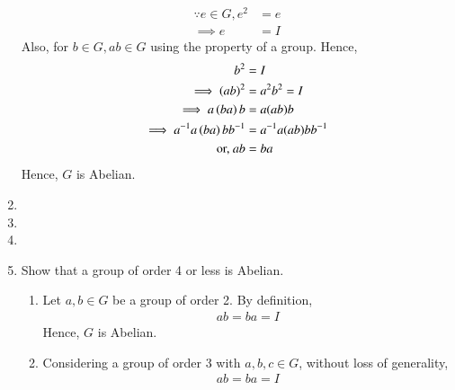 \begin{enumerate}[label=\arabic*.,ref=\thesubsection.\theenumi]
	\solution 
\begin{align}
	\because e \in G, e^2 &= e	
	\\
	\implies e &=I
\end{align}
Also, for $b \in G, ab \in G$ using the property of a group.  Hence, 
\begin{align}
 b^2 &= I
	\\
	\implies \left(ab\right)^2 &=a^2b^2=I
	\\
	\implies a\left(ba\right)b &= a(ab)b
	\\
	\implies a^{-1}a\left(ba\right)bb^{-1} &= a^{-1}a(ab)bb^{-1}
\\
	\text{or, } ab &=ba
\end{align}
Hence, $G$ is Abelian.
\item 
\item 
\item 
\item Show that a group of order 4 or less is Abelian.
	\\
	\solution 
	\begin{enumerate}
		\item Let $a,b \in G$ be a group of order 2. By definition, 
			\begin{align}
				ab = ba = I
			\end{align}
			Hence, $G$ is Abelian.
		\item Considering a group of order 3 with $a,b,c \in G$, 
			without loss of generality,
			\begin{align}
				ab = ba = I
			\end{align}
	\end{enumerate}
\end{enumerate}
